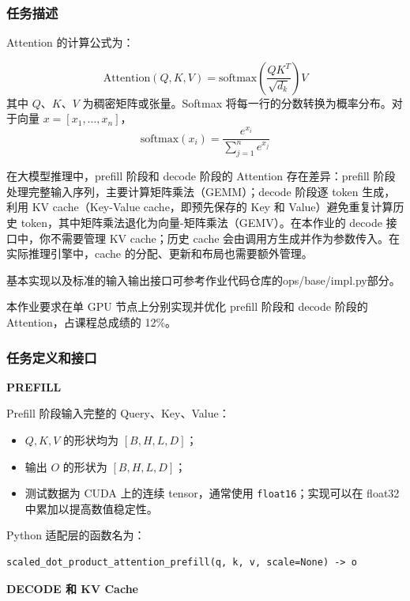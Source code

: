 \documentclass{article}
\begin{document}
\subsubsection{任务描述}
Attention 的计算公式为：

\begin{equation}
\text{Attention}(Q, K, V) = \text{softmax}\left(\frac{QK^T}{\sqrt{d_k}}\right) V
\end{equation}
其中 $Q$、$K$、$V$ 为稠密矩阵或张量。Softmax 将每一行的分数转换为概率分布。对于向量 \( x = [x_1, \dots, x_n] \)，
\begin{equation}
\text{softmax}(x_i) = \frac{e^{x_i}}{\sum_{j=1}^n e^{x_j}}
\end{equation}

在大模型推理中，prefill 阶段和 decode 阶段的 Attention 存在差异：prefill 阶段处理完整输入序列，主要计算矩阵乘法（GEMM）；decode 阶段逐 token 生成，利用 KV cache（Key-Value cache，即预先保存的 Key 和 Value）避免重复计算历史 token，其中矩阵乘法退化为向量-矩阵乘法（GEMV）。在本作业的 decode 接口中，你不需要管理 KV cache；历史 cache 会由调用方生成并作为参数传入。在实际推理引擎中，cache 的分配、更新和布局也需要额外管理。

基本实现以及标准的输入输出接口可参考作业代码仓库的ops/base/impl.py部分。

本作业要求在单 GPU 节点上分别实现并优化 prefill 阶段和 decode 阶段的 Attention，占课程总成绩的 12\%。

\subsubsection{任务定义和接口}

\textbf{PREFILL}

Prefill 阶段输入完整的 Query、Key、Value：
\begin{itemize}[leftmargin=2.5em]
  \item $Q,K,V$ 的形状均为 $[B,H,L,D]$；
  \item 输出 $O$ 的形状为 $[B,H,L,D]$；
  \item 测试数据为 CUDA 上的连续 tensor，通常使用 \texttt{float16}；实现可以在
        float32 中累加以提高数值稳定性。
\end{itemize}

Python 适配层的函数名为：
\begin{lstlisting}[style=interface]
scaled_dot_product_attention_prefill(q, k, v, scale=None) -> o
\end{lstlisting}

\textbf{DECODE 和 KV Cache}
\end{document}
